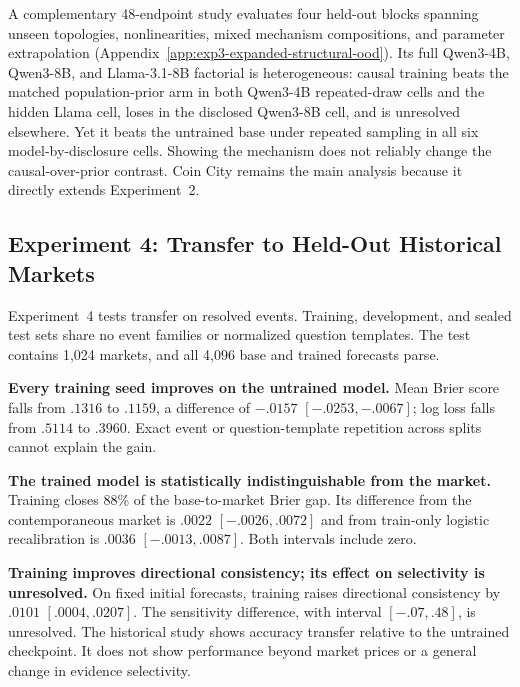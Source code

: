A complementary 48-endpoint study evaluates four held-out blocks spanning unseen
topologies, nonlinearities, mixed mechanism compositions, and parameter
extrapolation (Appendix~\ref{app:exp3-expanded-structural-ood}). Its full
Qwen3-4B, Qwen3-8B, and Llama-3.1-8B factorial is heterogeneous: causal training
beats the matched population-prior arm in both Qwen3-4B repeated-draw cells and
the hidden Llama cell, loses in the disclosed Qwen3-8B cell, and is unresolved
elsewhere. Yet it beats the untrained base under repeated sampling in all six
model-by-disclosure cells. Showing the mechanism does not reliably change the
causal-over-prior contrast. Coin City remains the main analysis because it
directly extends Experiment~2.

\subsection{Experiment 4: Transfer to Held-Out Historical Markets}
\label{sec:exp4}

Experiment~4 tests transfer on resolved events. Training, development, and sealed
test sets share no event families or normalized question templates. The test
contains 1,024 markets, and all 4,096 base and trained forecasts parse.

\begin{center}
\begin{minipage}{\linewidth}
\centering
{}
\label{tab:exp4-endpoint-results}
\scriptsize
\setlength{\tabcolsep}{3.5pt}
\resizebox{\linewidth}{!}{}
\end{minipage}
\end{center}

\textbf{Every training seed improves on the untrained model.}
Mean Brier score falls from $.1316$ to $.1159$, a difference of $-.0157$
$[-.0253,-.0067]$; log loss falls from $.5114$ to $.3960$. Exact event or
question-template repetition across splits cannot explain the gain.

\textbf{The trained model is statistically indistinguishable from the market.}
Training closes 88\% of the base-to-market Brier gap. Its difference from the
contemporaneous market is $.0022$ $[-.0026,.0072]$ and from train-only logistic
recalibration is $.0036$ $[-.0013,.0087]$. Both intervals include zero.

\textbf{Training improves directional consistency; its effect on selectivity is unresolved.}
On fixed initial forecasts, training raises directional consistency by $.0101$
$[.0004,.0207]$. The sensitivity difference, with interval $[-.07,.48]$, is
unresolved. The historical study shows accuracy transfer relative to the untrained
checkpoint. It does not show performance beyond market prices or a general change
in evidence selectivity.
